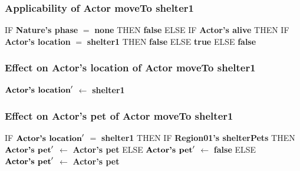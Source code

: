 \documentclass{article}%
\begin{document}
%
\subsubsection{Applicability of Actor moveTo shelter1}%
\label{ssubsec:Applicability of Actor moveTo shelter1}%
\begin{flushleft}%
IF %
\textbf{Nature's phase}%
$=$%
\textbf{none}%
\linebreak%
\hspace*{2em}%
THEN %
\textbf{false}%
\linebreak%
\hspace*{2em}%
ELSE %
IF %
\textbf{Actor's alive}%
\linebreak%
\hspace*{4em}%
THEN %
IF %
\textbf{Actor's location}%
$=$%
\textbf{shelter1}%
\linebreak%
\hspace*{6em}%
THEN %
\textbf{false}%
\linebreak%
\hspace*{6em}%
ELSE %
\textbf{true}%
\linebreak%
\hspace*{4em}%
ELSE %
\textbf{false}%
\end{flushleft}

%
\subsubsection{Effect on Actor's location of Actor moveTo shelter1}%
\label{ssubsec:Effect on Actor's location of Actor moveTo shelter1}%
\begin{flushleft}%
$\mbox{\textbf{Actor's location}} '$%
$\leftarrow$%
\textbf{shelter1}%
\end{flushleft}

%
\subsubsection{Effect on Actor's pet of Actor moveTo shelter1}%
\label{ssubsec:Effect on Actor's pet of Actor moveTo shelter1}%
\begin{flushleft}%
IF %
$\mbox{\textbf{Actor's location}} '$%
$=$%
\textbf{shelter1}%
\linebreak%
\hspace*{2em}%
THEN %
IF %
\textbf{Region01's shelterPets}%
\linebreak%
\hspace*{4em}%
THEN %
$\mbox{\textbf{Actor's pet}} '$%
$\leftarrow$%
\textbf{Actor's pet}%
\linebreak%
\hspace*{4em}%
ELSE %
$\mbox{\textbf{Actor's pet}} '$%
$\leftarrow$%
\textbf{false}%
\linebreak%
\hspace*{2em}%
ELSE %
$\mbox{\textbf{Actor's pet}} '$%
$\leftarrow$%
\textbf{Actor's pet}%
\end{flushleft}
\end{document}

